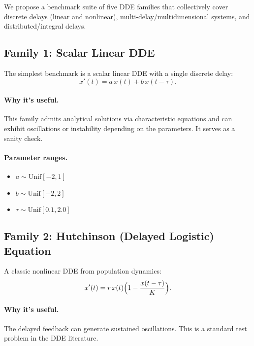 
We propose a benchmark suite of five DDE families that collectively cover discrete delays
(linear and nonlinear), multi-delay/multidimensional systems, and distributed/integral delays.

\subsection{Family 1: Scalar Linear DDE}

The simplest benchmark is a scalar linear DDE with a single discrete delay:
\begin{equation}
  x'(t) = a \, x(t) + b \, x(t-\tau).
\end{equation}

\paragraph{Why it's useful.}
This family admits analytical solutions via characteristic equations and can exhibit
oscillations or instability depending on the parameters. It serves as a sanity check.

\paragraph{Parameter ranges.}
\begin{itemize}
  \item $a \sim \mathrm{Unif}[-2, 1]$
  \item $b \sim \mathrm{Unif}[-2, 2]$
  \item $\tau \sim \mathrm{Unif}[0.1, 2.0]$
\end{itemize}

\subsection{Family 2: Hutchinson (Delayed Logistic) Equation}

A classic nonlinear DDE from population dynamics:
\begin{equation}
  x'(t) = r \, x(t) \Bigl(1 - \frac{x(t-\tau)}{K}\Bigr).
\end{equation}

\paragraph{Why it's useful.}
The delayed feedback can generate sustained oscillations. This is a standard test problem
in the DDE literature.

